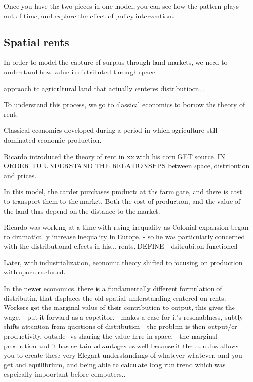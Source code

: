 \documentclass[]{article}
\begin{document}
Once you have the two pieces in one model, you can see how the pattern plays out of time, and explore the effect of policy interventions. 



\subsection{Spatial rents}
In order to model the capture of surplus through land markets, we need to understand how value is distributed through space.


appraoch to agricultural land that actually centeres distributioon,..

To understand this process, we go to classical economics to borrow the theory of rent.   

Classical economics developed during a period in which agriculture still dominated economic production.

Ricardo introduced the theory of rent in xx with his corn GET source.  IN ORDER TO UNDERSTAND THE RELATIONSHPS between space, distribution and prices.

In this model, the carder purchases products at the farm gate, and there is cost to transport them to the market. Both the cost of production, and the value of the land thus depend on the distance to the market.  

Ricardo was working at a time with rising inequality as Colonial expansion began to dramatically increase inequality in Europe. - so he was particularly concerned with the distributional effects in his...  rents. DEFINE - dsitrubiton functioned

Later, with industrialization, economic theory shifted to focusing on production with space excluded.

In the newer economics, there is a fundamentally different formulation of distributin, that displaces the old spatial understanding centered on rents. 
Workers get the marginal value of their contribution to output, this gives the wage. 
- put it forward as a copetitor.
- makes a case for it's resonablness, subtly shifts attention from questions of distribution - the problem is then output/or productivity, outside- vs sharing the value here in space. 
- the marginal production and it has certain advantages as well because it the calculus allows you to create these very Elegant understandings of whatever whatever, and you get and equilibrium, and being able to calculate long run trend  which was espeically impoortant before computers.. 
\end{document}
